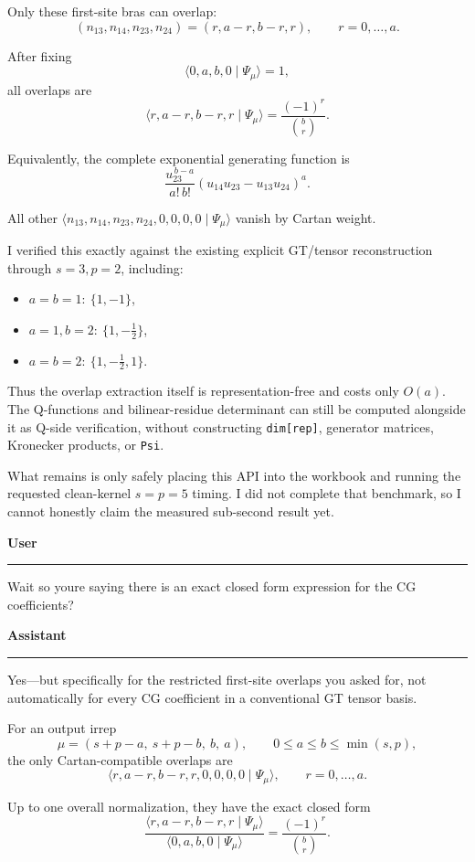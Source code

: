 \documentclass[11pt]{article}
\newcommand{\speaker}[2]{%
  \par\vspace{0.7em}%
  {\large\bfseries\color{#2}#1}\par
  \vspace{0.15em}\color{rulegray}\hrule\color{black}\vspace{0.55em}%
}
\newcommand{\Assistant}{\speaker{Assistant}{assistantblue}}
\newcommand{\User}{\speaker{User}{usergreen}}
\begin{document}
Only these first-site bras can overlap:
\[
  (n_{13},n_{14},n_{23},n_{24})
  =(r,a-r,b-r,r),\qquad r=0,\ldots,a.
\]

After fixing
\[
  \langle0,a,b,0\mid\Psi_\mu\rangle=1,
\]
all overlaps are
\[
  \boxed{
    \langle r,a-r,b-r,r\mid\Psi_\mu\rangle
    =\frac{(-1)^r}{\binom{b}{r}}
  }.
\]

Equivalently, the complete exponential generating function is
\[
  \boxed{
    \frac{u_{23}^{\,b-a}}{a!\,b!}
    \left(u_{14}u_{23}-u_{13}u_{24}\right)^a
  }.
\]

All other
\(\langle n_{13},n_{14},n_{23},n_{24},0,0,0,0\mid\Psi_\mu\rangle\)
vanish by Cartan weight.

I verified this exactly against the existing explicit GT/tensor reconstruction through
\(s=3,p=2\), including:
\begin{itemize}
  \item \(a=b=1:\ \{1,-1\}\),
  \item \(a=1,b=2:\ \{1,-\tfrac12\}\),
  \item \(a=b=2:\ \{1,-\tfrac12,1\}\).
\end{itemize}

Thus the overlap extraction itself is representation-free and costs only \(O(a)\). The
Q-functions and bilinear-residue determinant can still be computed alongside it as Q-side
verification, without constructing \texttt{dim[rep]}, generator matrices, Kronecker products,
or \texttt{Psi}.

What remains is only safely placing this API into the workbook and running the requested
clean-kernel \(s=p=5\) timing. I did not complete that benchmark, so I cannot honestly claim
the measured sub-second result yet.

\User

Wait so youre saying there is an exact closed form expression for the CG coefficients?

\Assistant

Yes---but specifically for the restricted first-site overlaps you asked for, not automatically
for every CG coefficient in a conventional GT tensor basis.

For an output irrep
\[
  \mu=(s+p-a,\ s+p-b,\ b,\ a),
  \qquad 0\leq a\leq b\leq\min(s,p),
\]
the only Cartan-compatible overlaps are
\[
  \langle r,a-r,b-r,r,0,0,0,0\mid\Psi_\mu\rangle,
  \qquad r=0,\ldots,a.
\]

Up to one overall normalization, they have the exact closed form
\[
  \frac{\langle r,a-r,b-r,r\mid\Psi_\mu\rangle}
       {\langle0,a,b,0\mid\Psi_\mu\rangle}
  =\frac{(-1)^r}{\binom{b}{r}}.
\]
\end{document}
